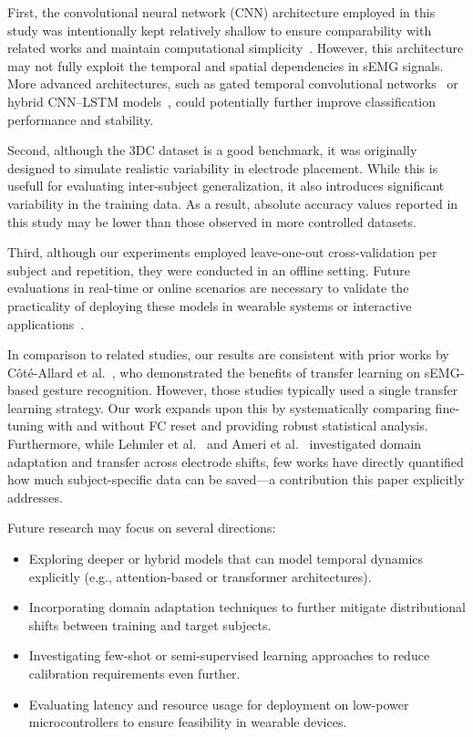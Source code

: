 \begin{multicols}{2}
First, the convolutional neural network (CNN) architecture employed in this study was intentionally kept relatively shallow to ensure comparability with related works and maintain computational simplicity~\cite{Cote2019_3DC,LibEMG2023}. However, this architecture may not fully exploit the temporal and spatial dependencies in sEMG signals. More advanced architectures, such as gated temporal convolutional networks~\cite{Xie2024} or hybrid CNN–LSTM models~\cite{Faust2018}, could potentially further improve classification performance and stability.

Second, although the 3DC dataset is a good benchmark, it was originally designed to simulate realistic variability in electrode placement. While this is usefull for evaluating inter-subject generalization, it also introduces significant variability in the training data. As a result, absolute accuracy values reported in this study may be lower than those observed in more controlled datasets.

Third, although our experiments employed leave-one-out cross-validation per subject and repetition, they were conducted in an offline setting. Future evaluations in real-time or online scenarios are necessary to validate the practicality of deploying these models in wearable systems or interactive applications~\cite{Shen2020}.

In comparison to related studies, our results are consistent with prior works by Côté-Allard et al.~\cite{Cote2019}, who demonstrated the benefits of transfer learning on sEMG-based gesture recognition. However, those studies typically used a single transfer learning strategy. Our work expands upon this by systematically comparing fine-tuning with and without FC reset and providing robust statistical analysis. Furthermore, while Lehmler et al.~\cite{Lehmler2021} and Ameri et al.~\cite{Ameri2020} investigated domain adaptation and transfer across electrode shifts, few works have directly quantified how much subject-specific data can be saved—a contribution this paper explicitly addresses.

Future research may focus on several directions:
\begin{itemize}
    \item Exploring deeper or hybrid models that can model temporal dynamics explicitly (e.g., attention-based or transformer architectures).
    \item Incorporating domain adaptation techniques to further mitigate distributional shifts between training and target subjects.
    \item Investigating few-shot or semi-supervised learning approaches to reduce calibration requirements even further.
    \item Evaluating latency and resource usage for deployment on low-power microcontrollers to ensure feasibility in wearable devices.
\end{itemize}


\end{multicols}
